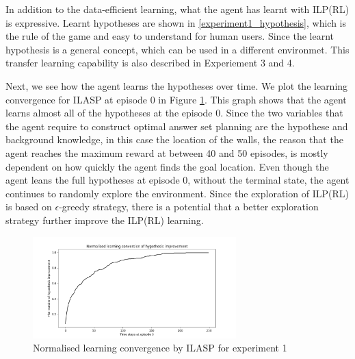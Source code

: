 

% 

In addition to the data-efficient learning, what the agent has learnt with ILP(RL) is expressive.
Learnt hypotheses are shown in \ref{experiment1_hypothesis}, which is the rule of the game and easy to understand for human users.
Since the learnt hypothesis is a general concept, which can be used in a different environmet.
This transfer learning capability is also described in Experiement 3 and 4.

Next, we see how the agent learns the hypotheses over time. We plot the learning convergence for ILASP at episode 0 in Figure \ref{experiment1_ilasp}.
This graph shows that the agent learns almost all of the hypotheses at the episode 0.
Since the two variables that the agent require to construct optimal answer set planning are the hypothese and background knowledge, in this case the location of the walls, 
the reason that the agent reaches the maximum reward at between 40 and 50 episodes, is mostly dependent on how quickly the agent finds the goal location.
Even though the agent leans the full hypotheses at episode 0, without the terminal state, the agent continues to randomly explore the environment.
Since the exploration of ILP(RL) is based on $\epsilon$-greedy strategy, there is a potential that a better exploration strategy further improve the ILP(RL) learning.

\begin{figure}[!htb]
\centering
\includegraphics[width=0.7\textwidth]{./figures/experiment1_ilasp}
\caption{Normalised learning convergence by ILASP for experiment 1}
\label{experiment1_ilasp}
\end{figure}

